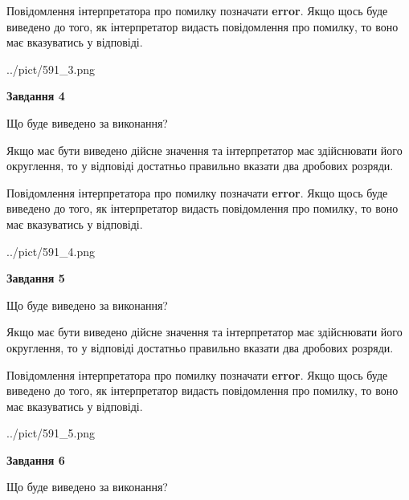 \documentclass[12pt, ukrainian]{article}
\begin{document}
{\begin {Large}
Повідомлення інтерпретатора про помилку позначати \textbf{error}.
Якщо щось буде виведено до того, як інтерпретатор видасть повідомлення про помилку, 
то воно має вказуватись у відповіді. \par

\begin{center}
	{../pict/591_3.png}
\end{center}
\newpage

{\begin {center}\textbf{Завдання 4}\end {center}}\par
Що буде виведено за виконання? \par

Якщо має бути виведено дійсне значення та інтерпретатор має здійснювати його округлення, 
то у відповіді достатньо правильно вказати два дробових розряди.

Повідомлення інтерпретатора про помилку позначати \textbf{error}.
Якщо щось буде виведено до того, як інтерпретатор видасть повідомлення про помилку, 
то воно має вказуватись у відповіді. \par

\begin{center}
	{../pict/591_4.png}
\end{center}
\newpage

{\begin {center}\textbf{Завдання 5}\end {center}}\par
Що буде виведено за виконання? \par

Якщо має бути виведено дійсне значення та інтерпретатор має здійснювати його округлення, 
то у відповіді достатньо правильно вказати два дробових розряди.

Повідомлення інтерпретатора про помилку позначати \textbf{error}.
Якщо щось буде виведено до того, як інтерпретатор видасть повідомлення про помилку, 
то воно має вказуватись у відповіді. \par

\begin{center}
	{../pict/591_5.png}
\end{center}
\newpage

{\begin {center}\textbf{Завдання 6}\end {center}}\par
Що буде виведено за виконання? \par


\end{Large}}
\end{document}
